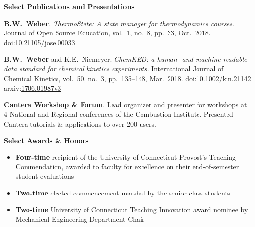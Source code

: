 \documentclass[11pt]{article}
\newcommand{\cvsection}[1]
{
\begin{center}
    \large\textcolor{sectcol}{\textbf{#1}}
\end{center}
}
\newenvironment{cvevent}[3]{%
%
\begin{tabular*}{1\textwidth}{p{13.9cm} x{3.04cm}}%
    \textbf{#2} - \textcolor{bgcol}{#3} & \vspace{2.5pt}\textcolor{sectcol}{#1}%
\end{tabular*}%

\vspace{-8pt}%
\textcolor{softcol}{\hrule}%
\vspace{6pt}%
}{
\vspace{6pt}
}
\newcommand*{\meauthor}[1]{\textbf{#1}}
\newcommand*{\papertitle}[1]{\textit{#1}}
\newcommand{\iconspace}{\enspace}
\newcommand{\arxiv}[1]{\aiarXiv\iconspace arxiv:\href{https://arxiv.org/abs/#1}{#1}}
\newcommand{\doi}[1]{\aiDoi\iconspace doi:\href{https://doi.org/#1}{#1}}
\begin{document}

\vspace{-10pt}

\cvsection{Select Publications and Presentations}

\meauthor{B.W.\ Weber}. \papertitle{ThermoState: A state manager for thermodynamics
courses}. Journal of Open Source Education, vol.\ 1, no.\ 8, pp.\ 33,
Oct.\ 2018.
\doi{10.21105/jose.00033}

\meauthor{B.W.\ Weber} and K.E.\ Niemeyer. \papertitle{ChemKED: a human- and
machine-readable data standard for chemical kinetics experiments.} International Journal
of Chemical Kinetics, vol.\ 50, no.\ 3, pp.\ 135--148, Mar.\ 2018.
\doi{10.1002/kin.21142} \quad \arxiv{1706.01987v3}

\textbf{Cantera Workshop \& Forum}. Lead organizer and presenter for workshops at 4
National and Regional conferences of the Combustion Institute. Presented Cantera tutorials
\& applications to over 200 users.


\cvsection{Select Awards \& Honors}

\begin{itemize}[leftmargin=*]
    \item \textbf{Four-time} recipient of the University of Connecticut Provost's Teaching
    Commendation, awarded to faculty for excellence on their end-of-semester student evaluations
    \item \textbf{Two-time} elected commencement marshal by the senior-class students
    \item \textbf{Two-time} University of Connecticut Teaching Innovation award nominee by
    Mechanical Engineering Department Chair
\end{itemize}
\end{document}
